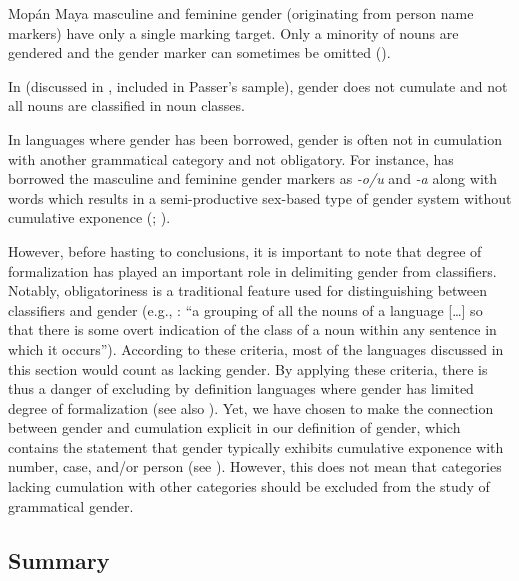 \documentclass[output=collectionpaper]{langsci/langscibook}
\begin{document}
Mopán Maya masculine and feminine gender (originating from person name markers) have only a single marking target. Only a minority of nouns are gendered and the gender marker can sometimes be omitted (\citealt[133]{Contini-Morava2018}).

In  (discussed in , included in Passer's sample), gender does not cumulate and not all nouns are classified in noun classes.

In languages where gender has been borrowed, gender is often not in cumulation with another grammatical category and not obligatory. For instance,  has borrowed the  masculine and feminine gender markers as \textit{-o/u} and \textit{-a} along with  words which results in a semi-productive sex-based type of gender system without cumulative exponence (\citealt{Stolz2012}; ).

However, before hasting to conclusions, it is important to note that degree of formalization has played an important role in delimiting gender from classifiers. Notably, obligatoriness is a traditional feature used for distinguishing between classifiers and gender (e.g., \citealt[160]{Dixon1982}: ``a grouping of all the nouns of a language [{\dots}] so that there is some overt indication of the class of a noun within any sentence in which it occurs''). According to these criteria, most of the languages discussed in this section would count as lacking gender. By applying these criteria, there is thus a danger of excluding by definition languages where gender has limited degree of formalization (see also ). Yet, we have chosen to make the connection between gender and cumulation explicit in our definition of gender, which contains the statement that gender typically exhibits cumulative exponence with number, case, and/or person (see ). However, this does not mean that categories lacking cumulation with other categories should be excluded from the study of grammatical gender.

  \subsection{Summary}
\end{document}
